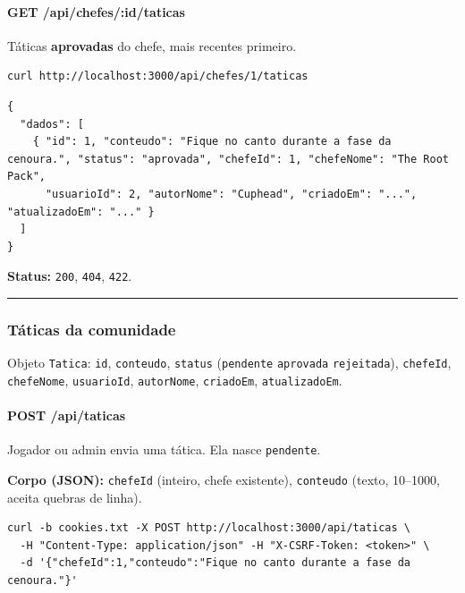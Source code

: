 \hypertarget{get-apichefesidtaticas}{%
\paragraph{GET /api/chefes/:id/taticas}\label{get-apichefesidtaticas}}

Táticas \textbf{aprovadas} do chefe, mais recentes primeiro.

\begin{Verbatim}[breaklines,breakanywhere,fontsize=\scriptsize]
curl http://localhost:3000/api/chefes/1/taticas
\end{Verbatim}

\begin{Verbatim}[breaklines,breakanywhere,fontsize=\scriptsize]
{
  "dados": [
    { "id": 1, "conteudo": "Fique no canto durante a fase da cenoura.", "status": "aprovada", "chefeId": 1, "chefeNome": "The Root Pack",
      "usuarioId": 2, "autorNome": "Cuphead", "criadoEm": "...", "atualizadoEm": "..." }
  ]
}
\end{Verbatim}

\textbf{Status:} \texttt{200}, \texttt{404}, \texttt{422}.

\begin{center}\rule{0.5\linewidth}{0.5pt}\end{center}

\hypertarget{tuxe1ticas-da-comunidade}{%
\subsubsection{Táticas da comunidade}\label{tuxe1ticas-da-comunidade}}

Objeto \texttt{Tatica}: \texttt{id}, \texttt{conteudo}, \texttt{status}
(\texttt{pendente} \textbar{} \texttt{aprovada} \textbar{}
\texttt{rejeitada}), \texttt{chefeId}, \texttt{chefeNome},
\texttt{usuarioId}, \texttt{autorNome}, \texttt{criadoEm},
\texttt{atualizadoEm}.

\hypertarget{post-apitaticas}{%
\paragraph{POST /api/taticas}\label{post-apitaticas}}

Jogador ou admin envia uma tática. Ela nasce \texttt{pendente}.

\textbf{Corpo (JSON):} \texttt{chefeId} (inteiro, chefe existente),
\texttt{conteudo} (texto, 10--1000, aceita quebras de linha).

\begin{Verbatim}[breaklines,breakanywhere,fontsize=\scriptsize]
curl -b cookies.txt -X POST http://localhost:3000/api/taticas \
  -H "Content-Type: application/json" -H "X-CSRF-Token: <token>" \
  -d '{"chefeId":1,"conteudo":"Fique no canto durante a fase da cenoura."}'
\end{Verbatim}


